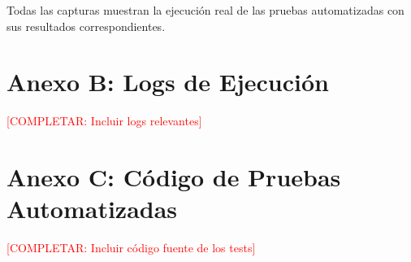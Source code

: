 \documentclass[12pt,a4paper]{article}
\begin{document}
Todas las capturas muestran la ejecución real de las pruebas automatizadas con sus resultados correspondientes.

\section{Anexo B: Logs de Ejecución}
\textcolor{red}{[COMPLETAR: Incluir logs relevantes]}

\section{Anexo C: Código de Pruebas Automatizadas}
\textcolor{red}{[COMPLETAR: Incluir código fuente de los tests]}

\end{document}
